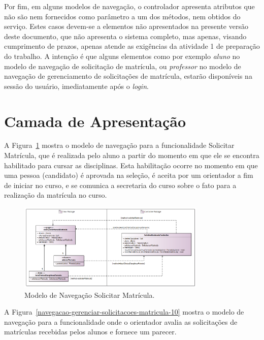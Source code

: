 Por fim, em alguns modelos de navegação, o controlador apresenta atributos que não são nem fornecidos como parâmetro a um dos métodos, nem obtidos do serviço. Estes casos devem-se a elementos não apresentados na presente versão deste documento, que não apresenta o sistema completo, mas apenas, visando cumprimento de prazos, apenas atende as exigências da atividade 1 de preparação do trabalho. A intenção é que alguns elementos como por exemplo \textit{aluno} no modelo de navegação de solicitação de matrícula, ou \textit{professor} no modelo de navegação de gerenciamento de solicitações de matrícula, estarão disponíveis na sessão do usuário, imediatamente após o \textit{login}.

\section{Camada de Apresentação}
\label{sec-arquitetura-apresentacao}



A Figura~\ref{navegacao-solicitar-matricula-10} mostra o modelo de navegação para a funcionalidade Solicitar Matrícula, que é realizada pelo aluno a partir do momento em que ele se encontra habilitado para cursar as disciplinas. Esta habilitação ocorre no momento em que uma pessoa (candidato) é aprovada na seleção, é aceita por um orientador a fim de iniciar no curso, e se comunica a secretaria do curso sobre o fato para a realização da matrícula no curso.

\begin{figure}[h]
	\centering
	\includegraphics[width=0.8\textwidth]{figuras/navegacao-solicitar-matricula-10.png}
	\caption{Modelo de Navegação Solicitar Matrícula.}
	\label{navegacao-solicitar-matricula-10}
\end{figure}

A Figura~\ref{navegacao-gerenciar-solicitacoes-matricula-10} mostra o modelo de navegação para a funcionalidade onde o orientador avalia as solicitações de matrículas recebidas pelos alunos e fornece um parecer.

